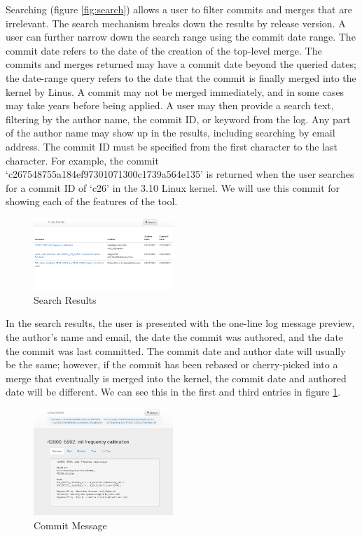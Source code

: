 \documentclass[conference, draftclsnofoot, draft]{IEEEtran}
\begin{document}
Searching (figure \ref{fig:search}) allows a user to filter commits and merges that
are irrelevant. The search mechanism breaks down the results by release version. A
user can further narrow down the search range using the commit date range. The
commit date refers to the date of the creation of the top-level merge. The commits
and merges returned may have a commit date beyond the queried dates; the date-range
query refers to the date that the commit is finally merged into the kernel by Linus.
A commit may not be merged immediately, and in some cases may take years before
being applied. A user may then provide a search text, filtering by the author name,
the commit ID, or keyword from the log. Any part of the author name may show up in
the results, including searching by email address. The commit ID must be specified
from the first character to the last character. For example, the commit
`c267548755a184ef97301071300c1739a564e135' is returned when the user searches for a
commit ID of `c26' in the 3.10 Linux kernel. We will use this commit for showing
each of the features of the tool.

\begin{figure}
        \centering
        \includegraphics[width=0.47\textwidth]{figures/search_results.png}
        \caption{Search Results}
        \label{fig:results}
\end{figure}

In the search results, the user is presented with the one-line log message preview,
the author's name and email, the date the commit was authored, and the date the
commit was last committed. The commit date and author date will usually be the same;
however, if the commit has been rebased or cherry-picked into a merge that
eventually is merged into the kernel, the commit date and authored date will be
different. We can see this in the first and third entries in figure
\ref{fig:results}.

\begin{figure}
        \centering
        \includegraphics[width=0.47\textwidth]{figures/message_view.png}
        \caption{Commit Message}
        \label{fig:message}
\end{figure}
\end{document}
